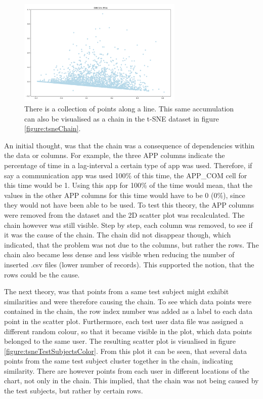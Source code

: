 \begin{figure}[h]
  \centering
  \includegraphics[width=0.7\textwidth]{./images/pcaChain.png}
  \caption{There is a collection of points along a line. This same accumulation can also be visualised as a chain in the t-SNE dataset in figure \ref{figure:tsneChain}.}
  \label{figure:pcaChain}
\end{figure}


An initial thought, was that the chain was a consequence of dependencies within the data or columns. For example, the three APP columns indicate the percentage of time in a lag-interval a certain type of app was used. Therefore, if say a communication app was used 100\% of this time, the APP\_COM cell for this time would be 1. Using this app for 100\% of the time would mean, that the values in the other APP columns for this time would have to be 0 (0\%), since they would not have been able to be used. To test this theory, the APP columns were removed from the dataset and the 2D scatter plot was recalculated. The chain however was still visible. Step by step, each column was removed, to see if it was the cause of the chain. The chain did not disappear though, which indicated, that the problem was not due to the columns, but rather the rows.  The chain also became less dense and less visible when reducing the number of inserted .csv files (lower number of records). This supported the notion, that the rows could be the cause.

The next theory, was that points from a same test subject might exhibit similarities and were therefore causing the chain. To see which data points were contained in the chain, the row index number was added as a label to each data point in the scatter plot. Furthermore, each test user data file was assigned a different random colour, so that it became visible in the plot, which data points belonged to the same user. The resulting scatter plot is visualised in figure \ref{figure:tsneTestSubjectsColor}. From this plot it can be seen, that several data points from the same test subject cluster together in the chain, indicating similarity. There are however points from each user in different locations of the chart, not only in the chain. This implied, that the chain was not being caused by the test subjects, but rather by certain rows. 

